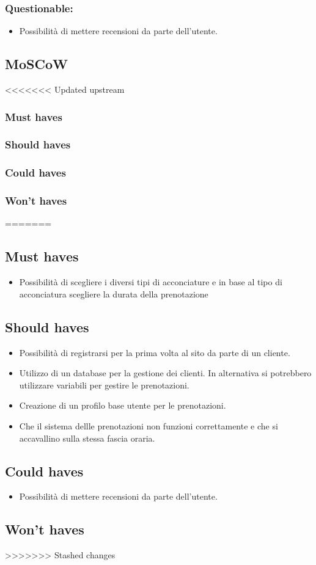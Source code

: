 \documentclass{article}
\begin{document}
\subsubsection{Questionable:}
\begin{itemize}
    \item Possibilità di mettere recensioni da parte dell'utente.
\end{itemize}

\subsection{MoSCoW}

<<<<<<< Updated upstream
\subsubsection{Must haves}
\subsubsection{Should haves}
\subsubsection{Could haves}
\subsubsection{Won't haves}
=======
\subsection{Must haves}
\begin{itemize}
    \item Possibilità di scegliere i diversi tipi di acconciature e in 
    base al tipo di acconciatura scegliere la durata della prenotazione 
\end{itemize}

\subsection{Should haves}
\begin{itemize}
    \item Possibilità di registrarsi per la prima volta al sito da parte di un cliente.
    \item Utilizzo di un database per la gestione dei clienti. In alternativa si potrebbero utilizzare 
    variabili per gestire le prenotazioni.
    \item Creazione di un profilo base utente per le prenotazioni.
    \item Che il sistema dellle prenotazioni non funzioni correttamente 
    e che si accavallino sulla stessa fascia oraria.
\end{itemize}

\subsection{Could haves}
\begin{itemize}
    \item Possibilità di mettere recensioni da parte dell'utente.
\end{itemize}

\subsection{Won't haves}
>>>>>>> Stashed changes
\end{document}
